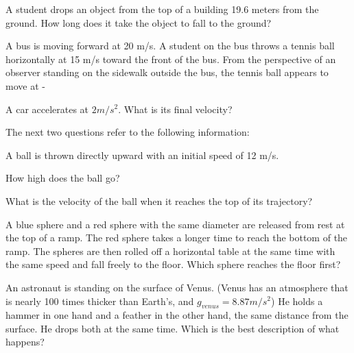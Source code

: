 \documentclass[10pt]{examdesign}
\begin{document}
\begin{multiplechoice} [title={Multiple Choice},
	rearrange=yes]
\begin{question}
	\end{question}

\begin{question}
A student drops an object from the top of a building 19.6 meters from the ground. How long does it take the object to fall to the ground? 

\end{question}

\begin{question}
A bus is moving forward at 20 m/s.  A student on the bus throws a tennis ball horizontally at 15 m/s toward the front of the bus.  From the perspective of an observer standing on the sidewalk outside the bus, the tennis ball appears to move at - 

	\end{question}

\begin{question}
	A car accelerates at $2 m/s^2$.  What is its final velocity?

\end{question}

\begin{block}
The next two questions refer to the following information:

	A ball is thrown directly upward with an initial speed of 12 m/s. 
	
\begin{question}
  How high does the ball go?
\
\end{question}

\begin{question}
What is the velocity of the ball when it reaches the top of its trajectory?


	\end{question}



\end{block}

\begin{question}
A blue sphere and a red sphere with the same diameter are released from rest at the top of a ramp. The red sphere takes a longer time to reach the bottom of the ramp. The spheres are then rolled off a horizontal table at the same time with the same speed and fall freely to the floor. Which sphere reaches the floor first? 

\end{question}

\begin{question}
	An astronaut is standing on the surface of Venus.  (Venus has an atmosphere that is nearly 100 times thicker than Earth's, and $g_{venus} = 8.87 m/s^2$)  He holds a hammer in one hand and a feather in the other hand, the same distance from the surface.  He drops both at the same time.  Which is the best description of what happens?

\end{question}




\end{multiplechoice}
\end{document}
